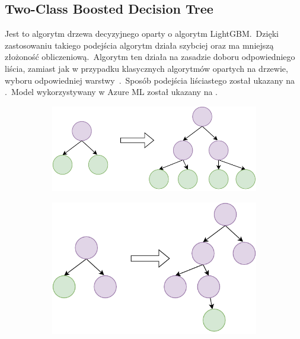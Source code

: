 \subsection{Two-Class Boosted Decision Tree}
Jest to algorytm drzewa decyzyjnego oparty o algorytm LightGBM.\ Dzięki zastosowaniu takiego podejścia algorytm działa szybciej oraz ma mniejszą złożoność obliczeniową.\ Algorytm ten działa na zasadzie doboru odpowiedniego liścia, zamiast jak w przypadku klasycznych algorytmów opartych na drzewie, wyboru odpowiedniej warstwy~\cite{LightGBM}.\ Sposób podejścia liściastego został ukazany na .\ Model wykorzystywany w Azure ML został ukazany na .
\vfill
\pagebreak
\begin{figure}[H]
    \begin{subfigure}[m]{\textwidth}
        \includegraphics[width=\textwidth]{images/level-wise}
    \end{subfigure}
    \begin{subfigure}[m]{\textwidth}
        \includegraphics[width=\textwidth]{images/leaf-wise}
    \end{subfigure}
    \label{fig:leaf}
\end{figure}


